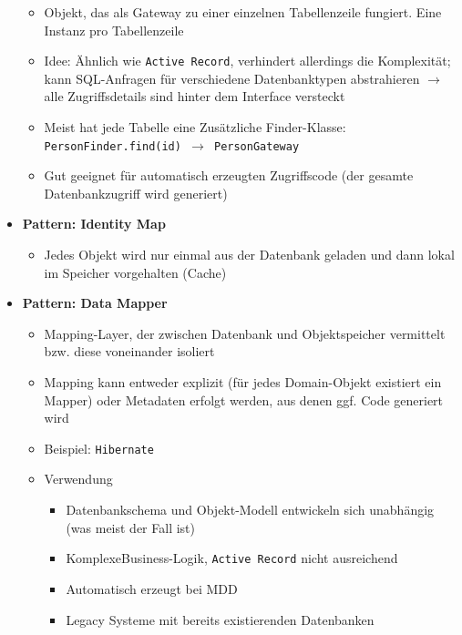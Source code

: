 \begin{itemize}
\begin{itemize}
		\item Objekt, das als Gateway zu einer einzelnen Tabellenzeile fungiert. Eine Instanz pro Tabellenzeile
		\item Idee: Ähnlich wie \texttt{Active Record}, verhindert allerdings die Komplexität; kann SQL-Anfragen für verschiedene Datenbanktypen abstrahieren \(\rightarrow\) alle Zugriffsdetails sind hinter dem Interface versteckt
		\item Meist hat jede Tabelle eine Zusätzliche Finder-Klasse: \texttt{PersonFinder.find(id) \(\rightarrow\) PersonGateway}
		\item Gut geeignet für automatisch erzeugten Zugriffscode (der gesamte Datenbankzugriff wird generiert)
	\end{itemize}
	\item \textbf{Pattern: Identity Map}
	\begin{itemize}
		\item Jedes Objekt wird nur einmal aus der Datenbank geladen und dann lokal im Speicher vorgehalten (Cache)
	\end{itemize}
	\item \textbf{Pattern: Data Mapper}
	\begin{itemize}
		\item Mapping-Layer, der zwischen Datenbank und Objektspeicher vermittelt bzw. diese voneinander isoliert
		\item Mapping kann entweder explizit (für jedes Domain-Objekt existiert ein Mapper) oder Metadaten erfolgt werden, aus denen ggf. Code generiert wird
		\item Beispiel: \texttt{Hibernate}
		\item Verwendung
		\begin{itemize}
			\item Datenbankschema und Objekt-Modell entwickeln sich unabhängig (was meist der Fall ist)
			\item KomplexeBusiness-Logik, \texttt{Active Record} nicht ausreichend
			\item Automatisch erzeugt bei MDD
			\item Legacy Systeme mit bereits existierenden Datenbanken
		\end{itemize}
	\end{itemize}
\end{itemize}

